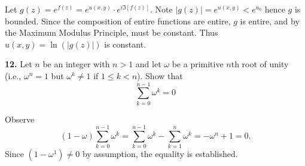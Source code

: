 \documentclass{homework}
\begin{document}
\begin{solution}
Let $g(z) = e^{f(z)} = e^{u(x,y)}\cdot e^{i\Im[f(z)]}$.  Note $|g(z)| = e^{u(x,y)} < e^{u_0}$ hence $g$ is bounded.  Since the composition of entire functions are entire, $g$ is entire, and by the Maximum Modulus Principle, must be constant.  Thus $u(x,y) = \ln(|g(z)|)$ is constant.
\end{solution}  

{\bf 12.} Let $n$ be an integer with $n>1$ and let $\omega$ be a primitive $n$th root of unity (i.e., $\omega^n=1$ but $\omega^k\not=1$ if $1\le k<n$). Show that 
$$
  \sum_{k=0}^{n-1} \omega^k = 0
$$

\begin{solution}
  Observe
$$
  (1-\omega)\sum_{k=0}^{n-1} \omega^k = \sum_{k=0}^{n-1} \omega^k -\sum_{k=1}^{n} \omega^k = -\omega^n + 1 = 0.
$$
Since $(1-\omega^1) \not=0$ by assumption, the equality is established.
\end{solution}



\end{document}
